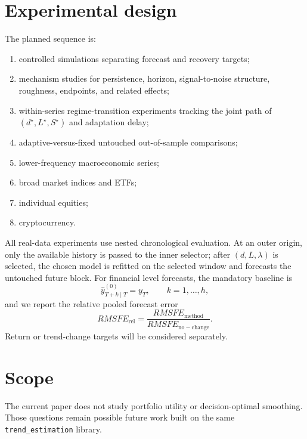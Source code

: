 \documentclass[11pt]{article}
\begin{document}
\section{Experimental design}
The planned sequence is:
\begin{enumerate}
\item controlled simulations separating forecast and recovery targets;
\item mechanism studies for persistence, horizon, signal-to-noise structure,
roughness, endpoints, and related effects;
\item within-series regime-transition experiments tracking the joint path of
\((d^\star,L^\star,S^\star)\) and adaptation delay;
\item adaptive-versus-fixed untouched out-of-sample comparisons;
\item lower-frequency macroeconomic series;
\item broad market indices and ETFs;
\item individual equities;
\item cryptocurrency.
\end{enumerate}
All real-data experiments use nested chronological evaluation. At an outer
origin, only the available history is passed to the inner selector; after
$(d,L,\lambda)$ is selected, the chosen model is refitted on the selected
window and forecasts the untouched future block. For financial level forecasts,
the mandatory baseline is
\begin{equation}
\label{eq:no-change}
\widehat y^{(0)}_{T+k\mid T}=y_T,
\qquad k=1,\ldots,h,
\end{equation}
and we report the relative pooled forecast error
\begin{equation}
\label{eq:relative-rmsfe}
RMSFE_{\mathrm{rel}}
=
\frac{RMSFE_{\mathrm{method}}}
{RMSFE_{\mathrm{no-change}}}.
\end{equation}
Return or trend-change targets will be considered separately.

\section{Scope}
The current paper does not study portfolio utility or decision-optimal
smoothing. Those questions remain possible future work built on the same
\texttt{trend\_estimation} library.


\end{document}
